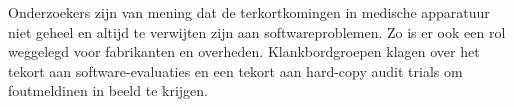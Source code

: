 \documentclass{article}
\begin{document}
	Onderzoekers zijn van mening dat de terkortkomingen in medische apparatuur niet geheel en altijd te verwijten zijn aan softwareproblemen. Zo is er ook een rol weggelegd voor fabrikanten en overheden.
	Klankbordgroepen klagen  over het tekort aan software-evaluaties en een tekort aan hard-copy audit trials om foutmeldinen in beeld te krijgen.
\end{document}
